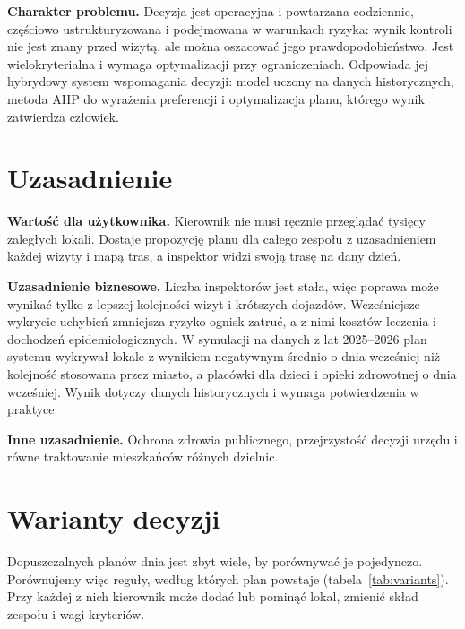 \documentclass[11pt,a4paper]{article}
\begin{document}
\textbf{Charakter problemu.} Decyzja jest operacyjna i powtarzana codziennie, częściowo
ustrukturyzowana i podejmowana w warunkach ryzyka: wynik kontroli nie jest znany przed wizytą,
ale można oszacować jego prawdopodobieństwo. Jest wielokryterialna i wymaga optymalizacji przy
ograniczeniach. Odpowiada jej hybrydowy system wspomagania decyzji: model uczony na danych
historycznych, metoda AHP do wyrażenia preferencji i optymalizacja planu, którego wynik
zatwierdza człowiek.

\section{Uzasadnienie}

\textbf{Wartość dla użytkownika.} Kierownik nie musi ręcznie przeglądać tysięcy zaległych
lokali. Dostaje propozycję planu dla całego zespołu z uzasadnieniem każdej wizyty i mapą tras,
a inspektor widzi swoją trasę na dany dzień.

\textbf{Uzasadnienie biznesowe.} Liczba inspektorów jest stała, więc poprawa może wynikać
tylko z lepszej kolejności wizyt i krótszych dojazdów. Wcześniejsze wykrycie uchybień zmniejsza
ryzyko ognisk zatruć, a z nimi kosztów leczenia i dochodzeń epidemiologicznych. W symulacji na danych z lat 2025--2026
plan systemu wykrywał lokale z wynikiem negatywnym średnio o \DaysSys{} dnia wcześniej niż
kolejność stosowana przez miasto, a placówki dla dzieci i opieki zdrowotnej o \DaysHiSys{} dnia
wcześniej. Wynik dotyczy danych historycznych i wymaga potwierdzenia w praktyce.

\textbf{Inne uzasadnienie.} Ochrona zdrowia publicznego, przejrzystość decyzji urzędu
i równe traktowanie mieszkańców różnych dzielnic.

\section{Warianty decyzji}

Dopuszczalnych planów dnia jest zbyt wiele, by porównywać je pojedynczo. Porównujemy więc
reguły, według których plan powstaje (tabela~\ref{tab:variants}). Przy każdej z nich kierownik
może dodać lub pominąć lokal, zmienić skład zespołu i wagi kryteriów.
\end{document}

